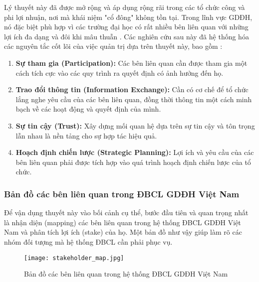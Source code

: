 \documentclass[12pt, a4paper, openany]{report}
\begin{document}
Lý thuyết này đã được mở rộng và áp dụng rộng rãi trong các tổ chức công và phi lợi nhuận, nơi mà khái niệm "cổ đông" không tồn tại. Trong lĩnh vực GDĐH, nó đặc biệt phù hợp vì các trường đại học có rất nhiều bên liên quan với những lợi ích đa dạng và đôi khi mâu thuẫn \cite{Langrafe2020}. Các nghiên cứu sau này đã hệ thống hóa các nguyên tắc cốt lõi của việc quản trị dựa trên thuyết này, bao gồm \cite{LangrafeEUR2020, IJLTER2024}:
\begin{enumerate}
    \item \textbf{Sự tham gia (Participation):} Các bên liên quan cần được tham gia một cách tích cực vào các quy trình ra quyết định có ảnh hưởng đến họ.
    \item \textbf{Trao đổi thông tin (Information Exchange):} Cần có cơ chế để tổ chức lắng nghe yêu cầu của các bên liên quan, đồng thời thông tin một cách minh bạch về các hoạt động và quyết định của mình.
    \item \textbf{Sự tin cậy (Trust):} Xây dựng mối quan hệ dựa trên sự tin cậy và tôn trọng lẫn nhau là nền tảng cho sự hợp tác hiệu quả.
    \item \textbf{Hoạch định chiến lược (Strategic Planning):} Lợi ích và yêu cầu của các bên liên quan phải được tích hợp vào quá trình hoạch định chiến lược của tổ chức.
\end{enumerate}

\subsubsection{Bản đồ các bên liên quan trong ĐBCL GDĐH Việt Nam}

Để vận dụng thuyết này vào bối cảnh cụ thể, bước đầu tiên và quan trọng nhất là nhận diện (mapping) các bên liên quan trong hệ thống ĐBCL GDĐH Việt Nam và phân tích lợi ích (stake) của họ. Một bản đồ như vậy giúp làm rõ các nhóm đối tượng mà hệ thống ĐBCL cần phải phục vụ.
\begin{figure}[h!]
    \centering
    \texttt{[image: stakeholder\_map.jpg]} 
    \caption{Bản đồ các bên liên quan trong hệ thống ĐBCL GDĐH Việt Nam}
    \label{fig:stakeholder-map}
\end{figure}
\end{document}
